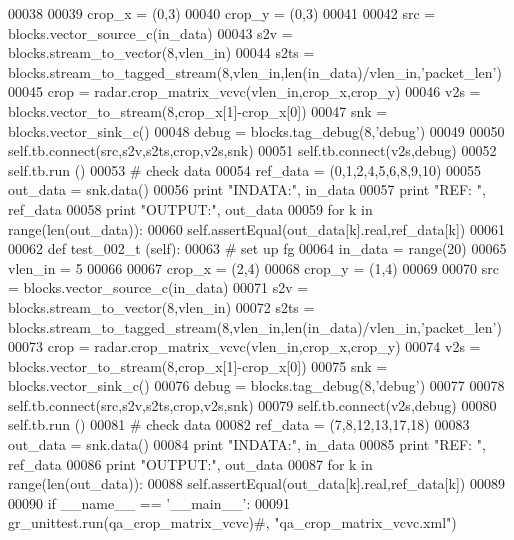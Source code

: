 \begin{DoxyCode}
00038         
00039         crop\_x = (0,3)
00040         crop\_y = (0,3)
00041         
00042         src = blocks.vector\_source\_c(in\_data)
00043         s2v = blocks.stream\_to\_vector(8,vlen\_in)
00044         s2ts = blocks.stream\_to\_tagged\_stream(8,vlen\_in,len(in\_data)/vlen\_in,\textcolor{stringliteral}{'packet\_len'})
00045         crop = radar.crop\_matrix\_vcvc(vlen\_in,crop\_x,crop\_y)
00046         v2s = blocks.vector\_to\_stream(8,crop\_x[1]-crop\_x[0])
00047         snk = blocks.vector\_sink\_c()
00048         debug = blocks.tag\_debug(8,\textcolor{stringliteral}{'debug'})
00049         
00050         self.tb.connect(src,s2v,s2ts,crop,v2s,snk)
00051         self.tb.connect(v2s,debug)
00052         self.tb.run ()
00053         \textcolor{comment}{# check data}
00054         ref\_data = (0,1,2,4,5,6,8,9,10)
00055         out\_data = snk.data()
00056         \textcolor{keywordflow}{print} \textcolor{stringliteral}{"INDATA:"}, in\_data
00057         \textcolor{keywordflow}{print} \textcolor{stringliteral}{"REF: "}, ref\_data
00058         \textcolor{keywordflow}{print} \textcolor{stringliteral}{"OUTPUT:"}, out\_data
00059         \textcolor{keywordflow}{for} k \textcolor{keywordflow}{in} range(len(out\_data)):
00060             self.assertEqual(out\_data[k].real,ref\_data[k])
00061             
00062     \textcolor{keyword}{def }test_002_t (self):
00063         \textcolor{comment}{# set up fg}
00064         in\_data = range(20)
00065         vlen\_in = 5
00066         
00067         crop\_x = (2,4)
00068         crop\_y = (1,4)
00069         
00070         src = blocks.vector\_source\_c(in\_data)
00071         s2v = blocks.stream\_to\_vector(8,vlen\_in)
00072         s2ts = blocks.stream\_to\_tagged\_stream(8,vlen\_in,len(in\_data)/vlen\_in,\textcolor{stringliteral}{'packet\_len'})
00073         crop = radar.crop\_matrix\_vcvc(vlen\_in,crop\_x,crop\_y)
00074         v2s = blocks.vector\_to\_stream(8,crop\_x[1]-crop\_x[0])
00075         snk = blocks.vector\_sink\_c()
00076         debug = blocks.tag\_debug(8,\textcolor{stringliteral}{'debug'})
00077         
00078         self.tb.connect(src,s2v,s2ts,crop,v2s,snk)
00079         self.tb.connect(v2s,debug)
00080         self.tb.run ()
00081         \textcolor{comment}{# check data}
00082         ref\_data = (7,8,12,13,17,18)
00083         out\_data = snk.data()
00084         \textcolor{keywordflow}{print} \textcolor{stringliteral}{"INDATA:"}, in\_data
00085         \textcolor{keywordflow}{print} \textcolor{stringliteral}{"REF: "}, ref\_data
00086         \textcolor{keywordflow}{print} \textcolor{stringliteral}{"OUTPUT:"}, out\_data
00087         \textcolor{keywordflow}{for} k \textcolor{keywordflow}{in} range(len(out\_data)):
00088             self.assertEqual(out\_data[k].real,ref\_data[k])
00089 
00090 \textcolor{keywordflow}{if} \_\_name\_\_ == \textcolor{stringliteral}{'\_\_main\_\_'}:
00091     gr\_unittest.run(qa\_crop\_matrix\_vcvc)\textcolor{comment}{#, "qa\_crop\_matrix\_vcvc.xml")}
\end{DoxyCode}
